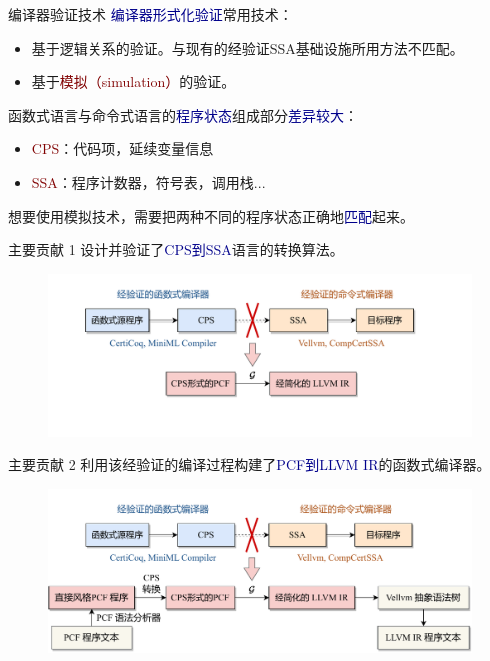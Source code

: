 \begin{frame}{编译器验证技术}
  \textcolor{DarkBlue}{编译器形式化验证}常用技术：
  \begin{itemize}
    \item 基于逻辑关系的验证。与现有的经验证SSA基础设施所用方法不匹配。
    \item 基于\textcolor{Maroon}{模拟（simulation）}的验证。
  \end{itemize}
  \vspace{2ex}
  函数式语言与命令式语言的\textcolor{DarkBlue}{程序状态}组成部分\textcolor{DarkBlue}{差异较大}：
  \begin{itemize}
    \item \textcolor{Maroon}{CPS}：代码项，延续变量信息
    \item \textcolor{Maroon}{SSA}：程序计数器，符号表，调用栈...
  \end{itemize}
  想要使用模拟技术，需要把两种不同的程序状态正确地\textcolor{DarkBlue}{匹配}起来。
\end{frame}

\begin{frame}{主要贡献 1}
  \large
  设计并验证了\textcolor{DarkBlue}{CPS到SSA}语言的转换算法。
  \begin{figure}
    \centering
    \includegraphics[width=0.95\linewidth]{figures/part.pdf}
  \end{figure}  
\end{frame}

\begin{frame}{主要贡献 2}
  \large
  利用该经验证的编译过程构建了\textcolor{DarkBlue}{PCF到LLVM IR}的函数式编译器。
  \begin{figure}
    \centering
    \includegraphics[width=0.95\linewidth]{figures/whole.pdf}
  \end{figure}  
\end{frame}


